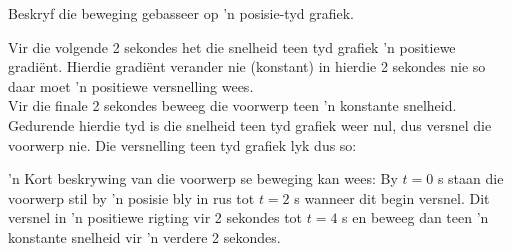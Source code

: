 \begin{wex}{Beskryf die beweging gebasseer op  'n posisie-tyd grafiek.}
{
Vir die volgende 2 sekondes het die snelheid teen tyd grafiek  'n positiewe gradi\"ent. Hierdie gradi\"ent verander nie (konstant) in hierdie 2 sekondes nie so daar moet  'n positiewe versnelling wees. \\

Vir die finale 2 sekondes beweeg die voorwerp teen  'n konstante snelheid. Gedurende hierdie tyd is die snelheid teen tyd grafiek weer nul, dus versnel die voorwerp nie. Die versnelling teen tyd grafiek lyk dus so:

\begin{center}
\end{center}

 'n Kort beskrywing van die voorwerp se beweging kan wees: By $t=0$ s staan die voorwerp stil by  'n posisie bly in rus tot $t=2$ s wanneer dit begin versnel. Dit versnel in  'n positiewe rigting vir 2 sekondes tot $t=4$ s en beweeg dan teen  'n konstante snelheid vir  'n verdere 2 sekondes.
}
\end{wex}

